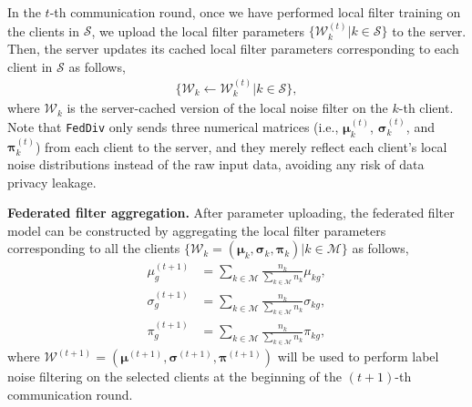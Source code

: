 \documentclass[letterpaper]{article} %
\begin{document}
In the $t$-th communication round, once we have performed local filter training on the clients in $\mathcal{S}$, we upload the local filter parameters $\{\mathcal{W}_{k}^{(t)}|k\in\mathcal{S}\}$ to the server. Then, the server updates its cached local filter parameters corresponding to each client in $\mathcal{S}$ as follows,
\begin{equation}
    \begin{split}
        \{{\mathcal{W}}_{k} \leftarrow {\mathcal{W}}_{k}^{(t)} | k\in\mathcal{S}\},
    \end{split}
\end{equation}
where ${\mathcal{W}}_{k}$ is the server-cached version of the local noise filter on the $k$-th client. 
Note that \texttt{FedDiv} only sends three numerical matrices (i.e., $\boldsymbol{\mu}_{k}^{(t)}$, $\boldsymbol{\sigma}_{k}^{(t)}$, and $\boldsymbol{\pi}_{k}^{(t)}$) from each client to the server, and they merely reflect each client's local noise distributions instead of the raw input data, avoiding any risk of data privacy leakage.

\noindent
\textbf{Federated filter aggregation.} 
After parameter uploading, the federated filter model can be constructed by aggregating the local filter parameters corresponding to all the clients $\{\mathcal{W}_{k}=(\bm{\mu}_{k}, \bm{\sigma}_{k}, \bm{{\pi}}_{k})|k\in\mathcal{M}\}$  as follows, 
\begin{equation}
    \label{Equation:M-Step-at-Server}
    \begin{split}
        {{{\mu}}^{(t+1)}_{g}} &= \sum_{k\in \mathcal{M}} \frac{n_k}{\sum_{k\in \mathcal{M}} n_k}  {{\mu}}_{kg}, \\
        {{\sigma}^{(t+1)}_{g}} &= \sum_{k\in \mathcal{M}} \frac{n_k}{\sum_{k\in \mathcal{M}} n_k} {{\sigma}}_{kg}, \\
        {{{\pi}}^{(t+1)}_{g}} &= \sum_{k\in \mathcal{M}} \frac{n_k}{\sum_{k\in \mathcal{M}} n_k} {{\pi}}_{kg},
    \end{split}
\end{equation}
where $\mathcal{W}^{(t+1)}=(\bm{\mu}^{(t+1)}, \bm{\sigma}^{(t+1)}, \bm{{\pi}}^{(t+1)})$ will be used to perform label noise filtering on the selected clients at the beginning of the $(t+1)$-th communication round.
\end{document}
